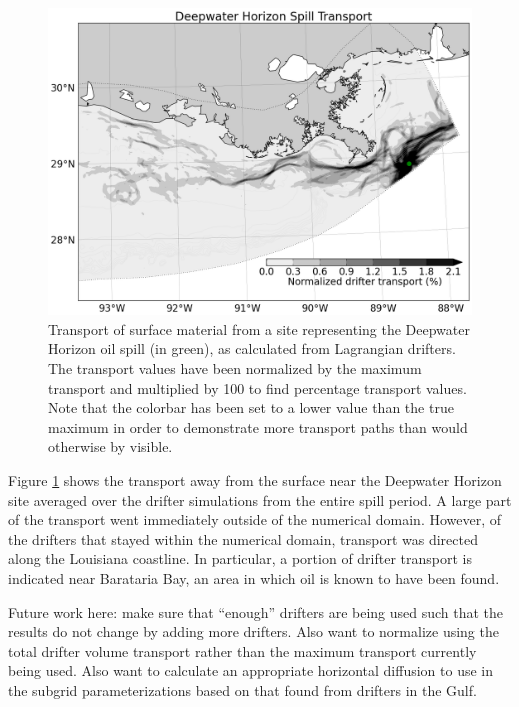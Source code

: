 \documentclass[11pt]{article}
\begin{document}
\begin{figure}
    \centering
    \includegraphics[width=\textwidth]{figures/dwh_stream_f/transport}
    \caption{Transport of surface material from a site representing the Deepwater Horizon oil spill (in green), as calculated from Lagrangian drifters. The transport values have been normalized by the maximum transport and multiplied by 100 to find percentage transport values. Note that the colorbar has been set to a lower value than the true maximum in order to demonstrate more transport paths than would otherwise by visible.}
    \label{fig:dwh_transport}
\end{figure}

Figure \ref{fig:dwh_transport} shows the transport away from the surface near the Deepwater Horizon site averaged over the drifter simulations from the entire spill period. A large part of the transport went immediately outside of the numerical domain. However, of the drifters that stayed within the numerical domain, transport was directed along the Louisiana coastline. In particular, a portion of drifter transport is indicated near Barataria Bay, an area in which oil is known to have been found.
 
Future work here: make sure that ``enough'' drifters are being used such that the results do not change by adding more drifters. Also want to normalize using the total drifter volume transport rather than the maximum transport currently being used. Also want to calculate an appropriate horizontal diffusion to use in the subgrid parameterizations based on that found from drifters in the Gulf.

\end{document}
